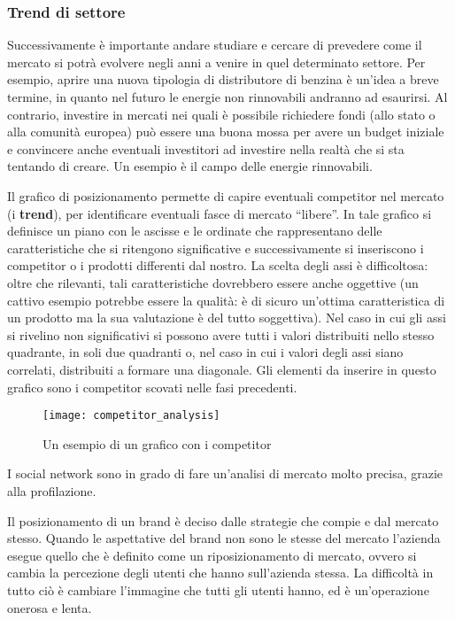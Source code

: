 \subsubsection{Trend di settore}
Successivamente è importante andare studiare e cercare di prevedere come il
mercato si potrà evolvere negli anni a venire in quel determinato settore.
Per esempio, aprire una nuova tipologia di distributore di benzina è un'idea a
breve termine, in quanto nel futuro le energie non rinnovabili andranno ad
esaurirsi. Al contrario, investire in mercati nei quali è possibile richiedere
fondi (allo stato o alla comunità europea) può essere una buona mossa per
avere un budget iniziale e convincere anche eventuali investitori ad
investire nella realtà che si sta tentando di creare. Un esempio è il campo
delle energie rinnovabili.

Il grafico di posizionamento permette di capire eventuali competitor nel
mercato (i \textbf{trend}), per identificare eventuali fasce di mercato
``libere''.
In tale grafico si definisce un piano con le ascisse e le ordinate che
rappresentano delle caratteristiche che si ritengono significative e
successivamente si inseriscono i competitor o i prodotti
differenti dal nostro. La scelta degli assi è difficoltosa: oltre che
rilevanti, tali caratteristiche dovrebbero essere anche oggettive (un cattivo
esempio potrebbe essere la qualità: è di sicuro un'ottima caratteristica di un
prodotto ma la sua valutazione è del tutto soggettiva). Nel caso in cui gli
assi si rivelino non significativi si possono avere tutti i valori distribuiti
nello stesso quadrante, in soli due quadranti o, nel caso in cui i valori degli
assi siano correlati, distribuiti a formare una diagonale. Gli elementi da
inserire in questo grafico sono i competitor scovati nelle fasi precedenti.

\begin{figure}[t]
  \centering
  \texttt{[image: competitor\_analysis]}
  \caption{Un esempio di un grafico con i competitor}
  \label{fig:dsl:ca}
\end{figure}


I social network sono in grado di fare un'analisi di mercato molto precisa,
grazie alla profilazione.

Il posizionamento di un brand è deciso dalle strategie che compie e dal mercato
stesso. Quando le aspettative del brand non sono le stesse del mercato
l'azienda esegue quello che è definito come un riposizionamento di mercato,
ovvero si cambia la percezione degli utenti che hanno sull'azienda stessa. La
difficoltà in tutto ciò è cambiare l'immagine che tutti gli utenti hanno, ed è
un'operazione onerosa e lenta.
